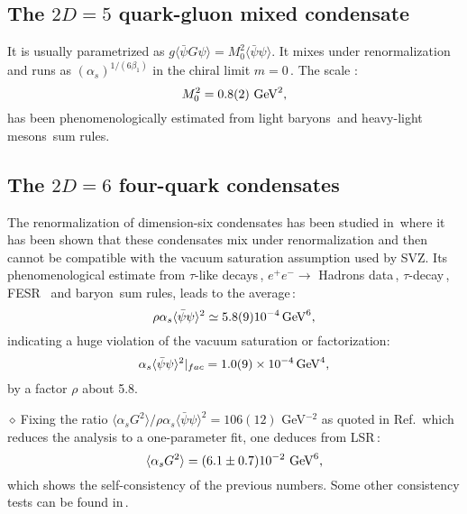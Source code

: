 \documentclass[aps,prd,groupedaddress,nofootinbib]{revtex4-1}
\def\beq{\begin{equation}}
\def\eeq{\end{equation}}
\def\la{\langle}
\def\ra{\rangle}
\def\d{$\diamond~$}
\begin{document}
\subsection{The $2D=5$ quark-gluon mixed condensate} 
It is usually parametrized as $g\la\bar \psi G\psi\ra=M_0^2\la \bar \psi\psi\ra$. It  mixes under renormalization and runs as $(\alpha_s)^{1/(6\beta_1)}$ in the chiral limit $m=0$\,\cite{SNTARRACH}. The scale :
\vspace*{-0.15cm}
\beq
M_0^2=0.8(2)~{\rm GeV}^2,
\eeq
\vspace*{-0.15cm}
has been phenomenologically estimated from light baryons\,\cite{IOFFE,DOSCH,PIVOm} and heavy-light mesons\,\cite{SNhl} sum rules.

\subsection{The $2D=6$ four-quark condensates} 
The renormalization of  dimension-six  condensates has been studied in\,\cite{SNTARRACH} where it has been shown that these condensates mix under renormalization and then cannot be compatible with the vacuum saturation assumption used by SVZ.  Its phenomenological estimate from $\tau$-like decays\,\cite{SNTAU}, $e^+e^-\to$ Hadrons data\,\cite{LNT}, $\tau$-decay\,\cite{SOLA}, FESR \,\cite{FESR1,FESR2}  and baryon\,\cite{DOSCH} sum rules, leads to the average\,:
\vspace*{-0.15cm}
\beq
\rho \alpha_s\la\bar\psi\psi\ra^2\simeq 5.8(9)10^{-4}\,{\rm GeV}^6,
\label{eq:d6}
\eeq
\vspace*{-0.15cm}
indicating a huge violation of the vacuum saturation or factorization:
\beq
\alpha_s\la\bar\psi\psi\ra^2\vert_{fac} = 1.0(9)\times 10^{-4}\,{\rm GeV}^4,
\label{eq:fac}
\eeq
by a factor $\rho$ about 5.8.
 
 \d Fixing the ratio $\la \alpha_s G^2\ra/\rho \alpha_s\la\bar\psi\psi\ra^2= 106(12)$ GeV$^{-2}$ as quoted in Ref.\,\cite{SND21} which reduces the analysis to a one-parameter fit, one deduces from LSR\,\cite{SNTAU}:
 \vspace*{-0.45cm}
 \beq
 \la \alpha_s G^2\ra=  (6.1\pm 0.7)10^{-2}~{\rm GeV}^6,
 \eeq
 \vspace*{-0.15cm}
which shows the self-consistency of the previous numbers.  Some other consistency tests can be found in\,\cite{SNTAU}.

\end{document}
